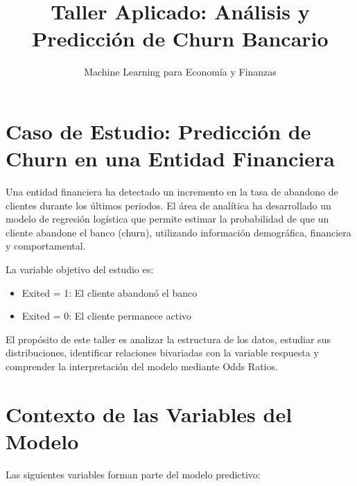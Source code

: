 \documentclass[
]{article}
\title{Taller Aplicado: Análisis y Predicción de Churn Bancario}
\author{Machine Learning para Economía y Finanzas}
\date{}
\providecommand{\tightlist}{%
  \setlength{\itemsep}{0pt}\setlength{\parskip}{0pt}}
\begin{document}
\maketitle

\section{Caso de Estudio: Predicción de Churn en una Entidad
Financiera}\label{caso-de-estudio-predicciuxf3n-de-churn-en-una-entidad-financiera}

Una entidad financiera ha detectado un incremento en la tasa de abandono
de clientes durante los últimos periodos. El área de analítica ha
desarrollado un modelo de regresión logística que permite estimar la
probabilidad de que un cliente abandone el banco (churn), utilizando
información demográfica, financiera y comportamental.

La variable objetivo del estudio es:

\begin{itemize}
\tightlist
\item
  Exited = 1: El cliente abandonó el banco\\
\item
  Exited = 0: El cliente permanece activo
\end{itemize}

El propósito de este taller es analizar la estructura de los datos,
estudiar sus distribuciones, identificar relaciones bivariadas con la
variable respuesta y comprender la interpretación del modelo mediante
Odds Ratios.

\section{Contexto de las Variables del
Modelo}\label{contexto-de-las-variables-del-modelo}

Las siguientes variables forman parte del modelo predictivo:
\end{document}
